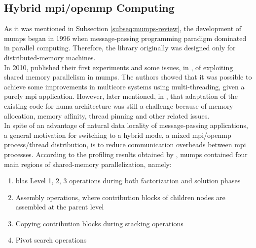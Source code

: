 \subsection{Hybrid \acrshort{mpi}/\acrshort{openmp} Computing}

\label{subseq:mpi-openmp}


As it was mentioned in Subsection \ref{subseq:mumps-review}, the development of \acrshort{mumps} began in 1996 when message-passing programming paradigm dominated in parallel computing. Therefore, the library originally was designed only for distributed-memory machines.\\

In 2010,  \citeauthor{chowdhury2010some} published their first experiments and some issues, in \cite{chowdhury2010some}, of exploiting shared memory parallelism in \acrshort{mumps}. The authors showed that it was possible to achieve some improvements in multicore systems using multi-threading, given a purely \acrshort{mpi} application. However, later \citeauthor{l2013introduction} mentioned, in \cite{l2013introduction}, that adaptation of the existing code for \acrshort{numa} architecture was still a challenge because of memory allocation, memory affinity, thread pinning and other related issues.\\


In spite of an advantage of natural data locality of message-passing applications, a general motivation for switching to a hybrid mode, a mixed \acrshort{mpi}/\acrshort{openmp} process/thread distribution, is to reduce communication overheads between \acrshort{mpi} processes. According to the profiling results obtained by \citeauthor{chowdhury2010some}, \acrshort{mumps} contained four main regions of shared-memory parallelization, namely: 

\begin{enumerate}

	\item \acrshort{blas} Level 1, 2, 3 operations during both factorization and solution phases \label{openmp-blocks-1}
	
	\item Assembly operations, where contribution blocks of children nodes are assembled at the parent level \label{openmp-blocks-2}
	
	\item Copying contribution blocks during stacking operations \label{openmp-blocks-3}
	
	\item Pivot search operations \label{openmp-blocks-4}

\end{enumerate}


